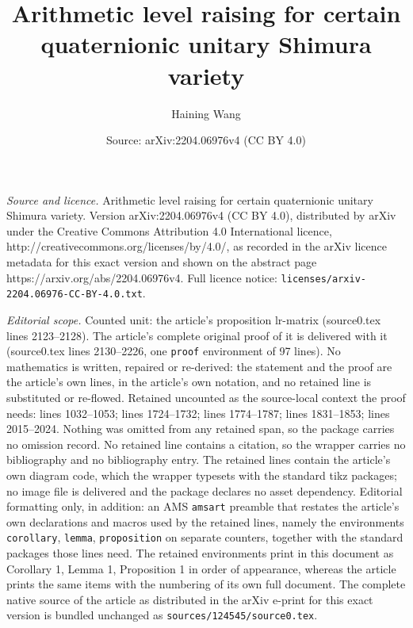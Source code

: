 \documentclass[10pt,a4paper]{amsart}
\title{Arithmetic level raising for certain quaternionic unitary Shimura variety}
\author{Haining Wang}
\date{Source: arXiv:2204.06976v4 (CC BY 4.0)}
\begin{document}
\maketitle

\noindent\emph{Source and licence.} Arithmetic level raising for certain quaternionic unitary Shimura variety. Version arXiv:2204.06976v4 (CC BY 4.0), distributed by arXiv under the Creative Commons Attribution 4.0 International licence, http://creativecommons.org/licenses/by/4.0/, as recorded in the arXiv licence metadata for this exact version and shown on the abstract page https://arxiv.org/abs/2204.06976v4. Full licence notice: \texttt{licenses/arxiv-2204.06976-CC-BY-4.0.txt}.\par\smallskip

\noindent\textit{Editorial scope.} Counted unit: the article's proposition lr-matrix (source0.tex lines 2123--2128). The article's complete original proof of it is delivered with it (source0.tex lines 2130--2226, one \texttt{proof} environment of 97 lines). No mathematics is written, repaired or re-derived: the statement and the proof are the article's own lines, in the article's own notation, and no retained line is substituted or re-flowed.  Retained uncounted as the source-local context the proof needs: lines 1032--1053; lines 1724--1732; lines 1774--1787; lines 1831--1853; lines 2015--2024.  Nothing was omitted from any retained span, so the package carries no omission record.  No retained line contains a citation, so the wrapper carries no bibliography and no bibliography entry.  The retained lines contain the article's own diagram code, which the wrapper typesets with the standard tikz packages; no image file is delivered and the package declares no asset dependency.  Editorial formatting only, in addition: an AMS \texttt{amsart} preamble that restates the article's own declarations and macros used by the retained lines, namely the environments \texttt{corollary}, \texttt{lemma}, \texttt{proposition} on separate counters, together with the standard packages those lines need.  The retained environments print in this document as Corollary 1, Lemma 1, Proposition 1 in order of appearance, whereas the article prints the same items with the numbering of its own full document.  The complete native source of the article as distributed in the arXiv e-print for this exact version is bundled unchanged as \texttt{sources/124545/source0.tex}.
\end{document}
